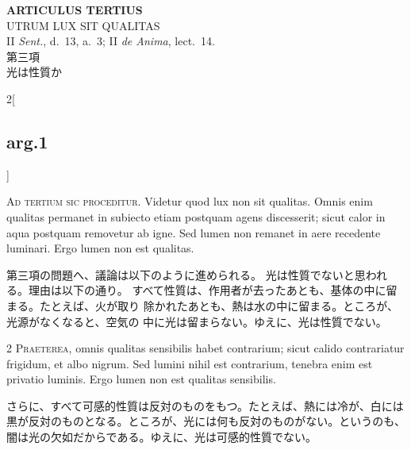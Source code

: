 \documentclass[paper=a4paper,fontsize=10pt,jafontsize=9pt,titlepage]{jlreq}
\begin{document}
\newpage
{}
{}
\setcounter{section}{3}
\setcounter{subsection}{0}







\begin{center}
 {\Large {\bfseries ARTICULUS TERTIUS}}\\
 {\large UTRUM LUX SIT QUALITAS}\\
 {\footnotesize II {\itshape Sent.}, d.~13, a.~3; II {\itshape de
 Anima}, lect.~14.}\\
 {\Large 第三項\\光は性質か}
\end{center}

\begin{paracol}{2}[\subsection{arg.1}]

{\huge A}{\scshape d tertium sic proceditur}. Videtur quod lux
non sit qualitas. Omnis enim qualitas permanet in subiecto etiam
postquam agens discesserit; sicut calor in aqua postquam removetur ab
igne. Sed lumen non remanet in aere recedente luminari. Ergo lumen non
est qualitas.

\switchcolumn

第三項の問題へ、議論は以下のように進められる。
光は性質でないと思われる。理由は以下の通り。
すべて性質は、作用者が去ったあとも、基体の中に留まる。たとえば、火が取り
 除かれたあとも、熱は水の中に留まる。ところが、光源がなくなると、空気の
 中に光は留まらない。ゆえに、光は性質でない。


{\scshape 2 Praeterea}, omnis qualitas sensibilis habet
contrarium; sicut calido contrariatur frigidum, et albo nigrum. Sed
lumini nihil est contrarium, tenebra enim est privatio luminis. Ergo
lumen non est qualitas sensibilis.

\switchcolumn

さらに、すべて可感的性質は反対のものをもつ。たとえば、熱には冷が、白には
 黒が反対のものとなる。ところが、光には何も反対のものがない。というのも、
 闇は光の欠如だからである。ゆえに、光は可感的性質でない。



\end{paracol}
\end{document}
